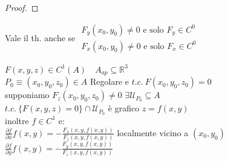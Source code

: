 \documentclass[a4paper, oneside]{article}
\begin{document}
\begin{proof}
\end{proof}

\begin{observation}
    Vale il th. anche se $\begin{matrix}
        F_y(x_0,y_0) \neq 0 \text{ e solo } F_y \in C^0\\
        F_x(x_0,y_0) \neq 0 \text{ e solo } F_x \in C^0
    \end{matrix}$
\end{observation}

\begin{theorem}
    $F(x,y,z) \in C^1(A) \quad A_{ap} \subseteq \mathbb{R}^3$\\
    $P_0 \equiv (x_0,y_0,z_0) \in A$ Regolare e $t.c. \ F(x_0,y_0,z_0) = 0$\\
    supponiamo $F_z(x_0,y_0,z_0) \neq 0$   $\exists \mathcal{U}_{P_0} \subseteq A$\\
    $t.c. \ \{F(x,y,z) = 0\} \cap \mathcal{U}_{P_0}$ è grafico $z=f(x,y)$\\
    inoltre $f\in C^1$ e:\\
    $\frac{\partial f}{\partial x} f(x,y) = -\frac{F_x(x,y,f(x,y))}{F_z(x,y,f(x,y))}$ localmente vicino a $(x_0,y_0)$\\
    $\frac{\partial f}{\partial y} f(x,y) = -\frac{F_y(x,y,f(x,y))}{F_z(x,y,f(x,y))}$
\end{theorem}
\end{document}
